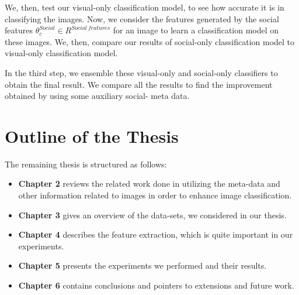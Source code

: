 	   We, then, test our visual-only classification model, to see how
accurate it is in classifying the images. Now, we consider the
features generated by the social features
$\theta_c ^{Social} \in R^{Social\ features}$ for an image to  learn
a classification model on these images.  We, then, compare our
results of social-only classification model to visual-only
classification model.
	
	   In the third step, we ensemble these visual-only and social-only
classifiers to obtain the final result. We compare all the results
to find the improvement obtained by using some auxiliary social-
meta data.

\section{Outline of the Thesis}
The remaining thesis is structured as follows:
\begin{itemize}
\item{{\bf Chapter 2} reviews the related work done in utilizing the meta-data and other information related to images in order to enhance image classification.}
\item{{\bf Chapter 3} gives an overview of the data-sets, we considered in our thesis. }
\item{{\bf Chapter 4} describes the feature extraction, which is quite important in our experiments.}
\item{{\bf Chapter 5} presents the experiments we performed and their results. }
\item{{\bf Chapter 6} contains conclusions and pointers to extensions and future work. }
\end{itemize}

